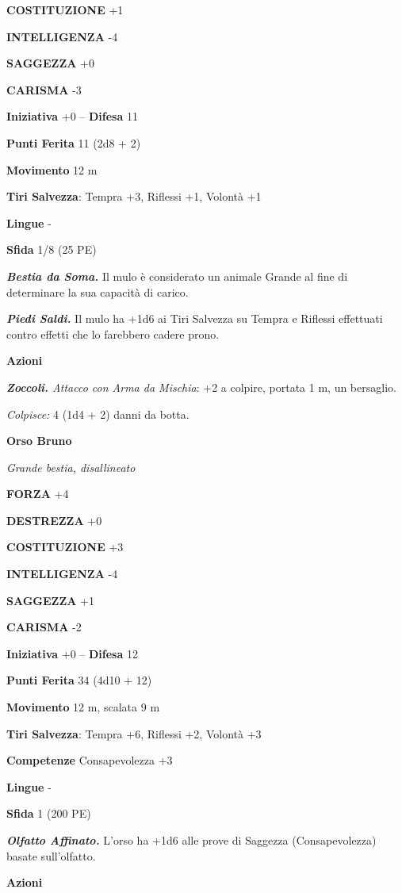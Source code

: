 \begin{multicols}{2}
\textbf{COSTITUZIONE} +1

\textbf{INTELLIGENZA} -4

\textbf{SAGGEZZA} +0

\textbf{CARISMA} -3

\textbf{Iniziativa} +0 -- \textbf{Difesa} 11

\textbf{Punti Ferita} 11 (2d8 + 2)

\textbf{Movimento} 12 m

\textbf{Tiri Salvezza}: Tempra +3, Riflessi +1, Volontà +1 

\textbf{Lingue} -

\textbf{Sfida} 1/8 (25 PE)

\emph{\textbf{Bestia da Soma.}} Il mulo è considerato un animale Grande al fine di determinare la sua capacità di carico.

\emph{\textbf{Piedi Saldi.}} Il mulo ha +1d6 ai Tiri Salvezza su Tempra e Riflessi effettuati contro effetti che lo farebbero cadere prono.

\textbf{Azioni}

\emph{\textbf{Zoccoli.} Attacco con Arma da Mischia}: +2 a colpire, portata 1 m, un bersaglio.

\emph{Colpisce:} 4 (1d4 + 2) danni da botta.

\medskip\textbf{Orso Bruno}

\emph{Grande bestia, disallineato}

\textbf{FORZA} +4

\textbf{DESTREZZA} +0

\textbf{COSTITUZIONE} +3

\textbf{INTELLIGENZA} -4

\textbf{SAGGEZZA} +1

\textbf{CARISMA} -2

\textbf{Iniziativa} +0 -- \textbf{Difesa} 12

\textbf{Punti Ferita} 34 (4d10 + 12)

\textbf{Movimento} 12 m, scalata 9 m

\textbf{Tiri Salvezza}: Tempra +6, Riflessi +2, Volontà +3 

\textbf{Competenze} Consapevolezza +3

\textbf{Lingue} -

\textbf{Sfida} 1 (200 PE)

\emph{\textbf{Olfatto Affinato.}} L'orso ha +1d6 alle prove di Saggezza (Consapevolezza) basate sull'olfatto.

\textbf{Azioni}


\end{multicols}
